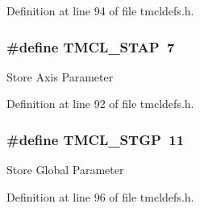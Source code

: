 Definition at line 94 of file tmcldefs.h.\hypertarget{group__ParComm_ga22d01b4d2941ab2a2881f17975424f41}{
\subsubsection[{TMCL\_\-STAP}]{\setlength{\rightskip}{0pt plus 5cm}\#define TMCL\_\-STAP~7}}
\label{group__ParComm_ga22d01b4d2941ab2a2881f17975424f41}
Store Axis Parameter 

Definition at line 92 of file tmcldefs.h.\hypertarget{group__ParComm_ga209b905332339e2b52a7166f46ef2db9}{
\subsubsection[{TMCL\_\-STGP}]{\setlength{\rightskip}{0pt plus 5cm}\#define TMCL\_\-STGP~11}}
\label{group__ParComm_ga209b905332339e2b52a7166f46ef2db9}
Store Global Parameter 

Definition at line 96 of file tmcldefs.h.